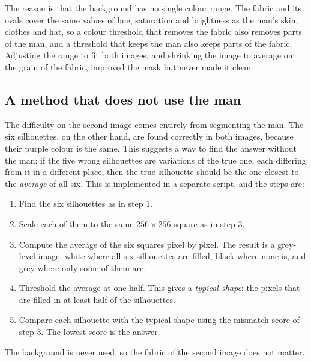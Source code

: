 \documentclass[11pt,a4paper]{article}
\begin{document}
The reason is that the background has no single colour range. The fabric and its ovals cover the same values of hue, saturation and brightness as the man's skin, clothes and hat, so a colour threshold that removes the fabric also removes parts of the man, and a threshold that keeps the man also keeps parts of the fabric. Adjusting the range to fit both images, and shrinking the image to average out the grain of the fabric, improved the mask but never made it clean.

\subsection{A method that does not use the man}

The difficulty on the second image comes entirely from segmenting the man. The six silhouettes, on the other hand, are found correctly in both images, because their purple colour is the same. This suggests a way to find the answer without the man: if the five wrong silhouettes are variations of the true one, each differing from it in a different place, then the true silhouette should be the one closest to the \emph{average} of all six. This is implemented in a separate script, and the steps are:
\begin{enumerate}
    \item Find the six silhouettes as in step 1.
    \item Scale each of them to the same $256\times256$ square as in step 3.
    \item Compute the average of the six squares pixel by pixel. The result is a grey-level image: white where all six silhouettes are filled, black where none is, and grey where only some of them are.
    \item Threshold the average at one half. This gives a \emph{typical shape}: the pixels that are filled in at least half of the silhouettes.
    \item Compare each silhouette with the typical shape using the mismatch score of step 3. The lowest score is the answer.
\end{enumerate}

The background is never used, so the fabric of the second image does not matter.
\end{document}

